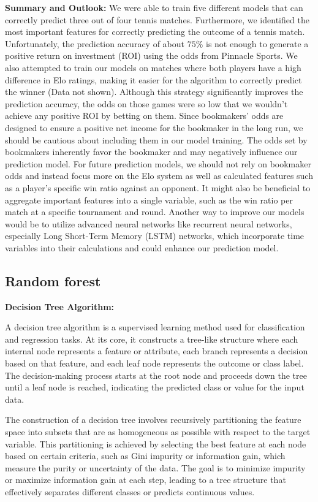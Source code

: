 \documentclass[preprint,aps,nofootinbib,a4paper,superscriptaddress,longbibliography,amsfonts,amssymb,amsmath,titlepage]{revtex4-2}
\begin{document}
\textbf{Summary and Outlook:}
We were able to train five different models that can correctly predict three out of four tennis matches. Furthermore, we identified the most important features for correctly predicting the outcome of a tennis match. Unfortunately, the prediction accuracy of about $75 \%$ is not enough to generate a positive return on investment (ROI) using the odds from Pinnacle Sports. We also attempted to train our models on matches where both players have a high difference in Elo ratings, making it easier for the algorithm to correctly predict the winner (Data not shown). Although this strategy significantly improves the prediction accuracy, the odds on those games were so low that we wouldn’t achieve any positive ROI by betting on them. Since bookmakers' odds are designed to ensure a positive net income for the bookmaker in the long run, we should be cautious about including them in our model training. The odds set by bookmakers inherently favor the bookmaker and may negatively influence our prediction model. For future prediction models, we should not rely on bookmaker odds and instead focus more on the Elo system as well as calculated features such as a player's specific win ratio against an opponent. It might also be beneficial to aggregate important features into a single variable, such as the win ratio per match at a specific tournament and round. Another way to improve our models would be to utilize advanced neural networks like recurrent neural networks, especially Long Short-Term Memory (LSTM) networks, which incorporate time variables into their calculations and could enhance our prediction model.

\subsection{Random forest}

\textbf{Decision Tree Algorithm:}

A decision tree algorithm is a supervised learning method used for classification and regression tasks. At its core, it constructs a tree-like structure where each internal node represents a feature or attribute, each branch represents a decision based on that feature, and each leaf node represents the outcome or class label. The decision-making process starts at the root node and proceeds down the tree until a leaf node is reached, indicating the predicted class or value for the input data.

The construction of a decision tree involves recursively partitioning the feature space into subsets that are as homogeneous as possible with respect to the target variable. This partitioning is achieved by selecting the best feature at each node based on certain criteria, such as Gini impurity or information gain, which measure the purity or uncertainty of the data. The goal is to minimize impurity or maximize information gain at each step, leading to a tree structure that effectively separates different classes or predicts continuous values.
\end{document}
